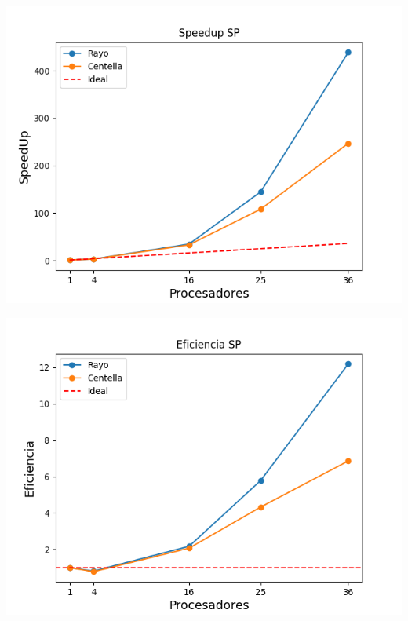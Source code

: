 \begin{center}
 \centering
 \begin{minipage}[b]{.49\textwidth}
  \includegraphics[width=1\linewidth]{plots/speed-up-sp.png}
 \end{minipage}
 \begin{minipage}[b]{.49\textwidth}
  \includegraphics[width=1\linewidth]{plots/efficiency-sp.png}
 \end{minipage}
\end{center}

